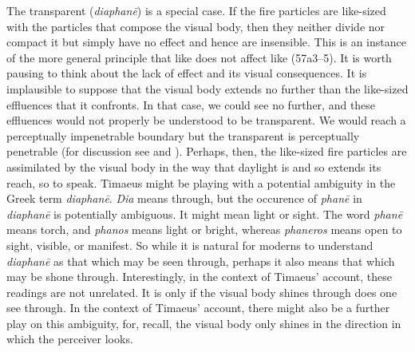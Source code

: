 The transparent (\emph{diaphanē}) is a special case. If the fire particles are like-sized with the particles that compose the visual body, then they neither divide nor compact it but simply have no effect and hence are insensible. This is an instance of the more general principle that like does not affect like (57a3--5). It is worth pausing to think about the lack of effect and its visual consequences. It is implausible to suppose that the visual body extends no further than the like-sized effluences that it confronts. In that case, we could see no further, and these effluences would not properly be understood to be transparent. We would reach a perceptually impenetrable boundary but the transparent is perceptually penetrable (for discussion see \citealt{Crowther:2018yt} and \citealt{Kalderon:2018wn}). Perhaps, then, the like-sized fire particles are assimilated by the visual body in the way that daylight is and so extends its reach, so to speak. Timaeus might be playing with a potential ambiguity in the Greek term \emph{diaphanē}. \emph{Dia} means through, but the occurence of \emph{phanē} in \emph{diaphanē} is potentially ambiguous. It might mean light or sight. The word \emph{phanē} means torch, and \emph{phanos} means light or bright, whereas \emph{phaneros} means open to sight, visible, or manifest. So while it is natural for moderns to understand \emph{diaphanē} as that which may be seen through, perhaps it also means that which may be shone through. Interestingly, in the context of Timaeus' account, these readings are not unrelated. It is only if the visual body shines through does one see through. In the context of Timaeus' account, there might also be a further play on this ambiguity, for, recall, the visual body only shines in the direction in which the perceiver looks.

